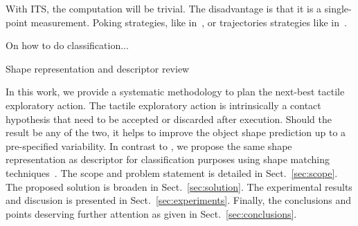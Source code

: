 With ITS, the computation will be trivial. The disadvantage is that it is a single-point measurement. Poking strategies, like in~\citet{Petrovskaya2011Global}, or trajectories strategies like in~\citet{Rosales2014Active}.



On how to do classification...

Shape representation and descriptor review \citet{Zhang2004Review}

In this work, we provide a systematic methodology to plan the next-best tactile exploratory action. The tactile exploratory action is intrinsically a contact hypothesis that need to be accepted or discarded after execution. Should the result be any of the two, it helps to improve the object shape prediction up to a pre-specified variability. In contrast to \citet{Bjorkman2013Enhancing}, we propose the same shape representation as descriptor for classification purposes using shape matching techniques~\citep{Belongie2002Shape}. The scope and problem statement is detailed in Sect.~\ref{sec:scope}. The proposed solution is broaden in Sect.~\ref{sec:solution}. The experimental results and discusion is presented in Sect.~\ref{sec:experiments}. Finally, the conclusions and points deserving further attention as given in Sect.~\ref{sec:conclusions}.
